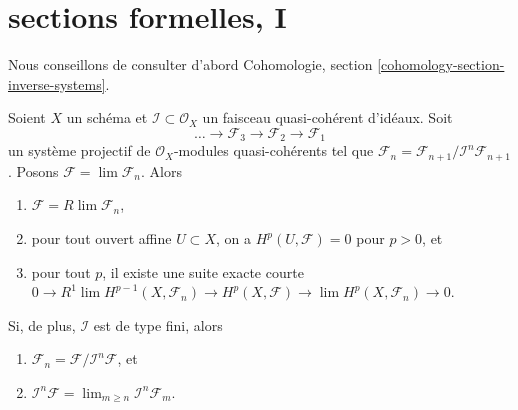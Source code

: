 \section{sections formelles, I}
\label{section-ML-degree-zero}

\noindent
Nous conseillons de consulter d'abord
Cohomologie, section \ref{cohomology-section-inverse-systems}.

\begin{lemma}
\label{lemma-properties-system}
Soient $X$ un schéma et $\mathcal{I} \subset \mathcal{O}_X$
un faisceau quasi-cohérent d'idéaux. Soit
$$
\ldots \to \mathcal{F}_3 \to \mathcal{F}_2 \to \mathcal{F}_1
$$
un système projectif de $\mathcal{O}_X$-modules quasi-cohérents
tel que
$\mathcal{F}_n = \mathcal{F}_{n + 1}/\mathcal{I}^n\mathcal{F}_{n + 1}$.
Posons $\mathcal{F} = \lim \mathcal{F}_n$. Alors
\begin{enumerate}
\item $\mathcal{F} = R\lim \mathcal{F}_n$,
\item pour tout ouvert affine $U \subset X$, on a
$H^p(U, \mathcal{F}) = 0$ pour $p > 0$, et
\item pour tout $p$, il existe une suite exacte courte
$0 \to R^1\lim H^{p - 1}(X, \mathcal{F}_n) \to
H^p(X, \mathcal{F}) \to \lim H^p(X, \mathcal{F}_n) \to 0$.
\end{enumerate}
Si, de plus, $\mathcal{I}$ est de type fini, alors
\begin{enumerate}
\item[(4)]
$\mathcal{F}_n = \mathcal{F}/\mathcal{I}^n\mathcal{F}$, et
\item[(5)]
$\mathcal{I}^n \mathcal{F} = \lim_{m \geq n} \mathcal{I}^n\mathcal{F}_m$.
\end{enumerate}
\end{lemma}

